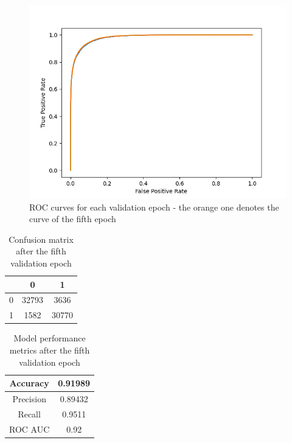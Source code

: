 \documentclass[12pt]{report}
\begin{document}
	\begin{figure}[h!]
		\centering
		\includegraphics[scale=0.7]{validation_4_2713.png}

		\caption{ ROC curves for each validation epoch - the orange 
		one denotes the curve of the fifth epoch}
		\label{figure:SLP003validation4}
	\end{figure}

	\begin{table}[h!]
		\caption{Confusion matrix after the fifth validation epoch}
		\vspace{0.2cm}
		\centering
		\begin{tabular}{ | c | c | c | }
			\hline 
			& 0 & 1 \\
			\hline  
			0 & 32793 & 3636 \\
			\hline 
			1 & 1582 & 30770 \\
			\hline    
		\end{tabular}
		\label{table:SLP003confusionMatrixValidation4}
	\end{table}

	\begin{table}[h!]
		\caption{Model performance metrics after the fifth validation epoch}
		\vspace{0.2cm}
		\centering
		\begin{tabular}{ | c | c | }
			\hline 
			Accuracy & 0.91989 \\
			\hline  
			Precision & 0.89432 \\
			\hline 
			Recall & 0.9511 \\
			\hline    
			ROC AUC & 0.92 \\
			\hline 
		\end{tabular}
		\label{table:SLP003metricsValidation4}
	\end{table}
\end{document}
